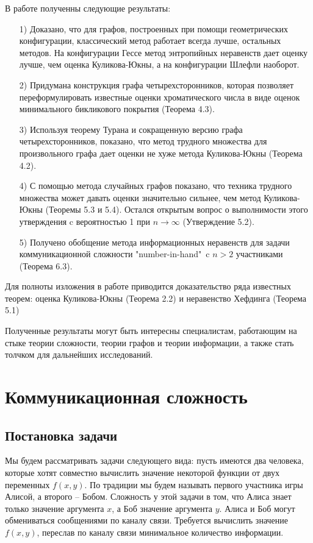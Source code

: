 \documentclass[a4paper]{article}
\begin{document}
В работе полученны следующие результаты:
\begin{itemize}[noitemsep]
    \item[1)] Доказано, что для графов, построенных при помощи геометрических конфигурации, классический метод 
    работает всегда лучше, остальных методов. На конфигурации Гессе метод энтропийных неравенств дает оценку лучше, 
    чем оценка Куликова-Юкны, а на конфигурации Шлефли наоборот. 
    \item[2)] Придумана конструкция графа четырехсторонников, которая позволяет переформулировать известные 
    оценки хроматического числа в виде оценок минимального бикликового покрытия (Теорема 4.3).
    \item[3)] Используя теорему Турана и сокращенную версию графа четырехсторонников, показано, что 
    метод трудного множества для произвольного графа дает оценки не хуже метода Куликова-Юкны (Теорема 4.2).
    \item[4)] С помощью метода случайных графов показано, что техника трудного множества может давать 
    оценки значительно сильнее, чем метод Куликова-Юкны (Теоремы 5.3 и 5.4). Остался открытым вопрос 
    о выполнимости этого утверждения c вероятностью 1 при $n \longrightarrow \infty$ (Утверждение 5.2).
    \item[5)] Получено обобщение метода информационных неравенств для задачи коммуникационной сложности 
    "number-in-hand"\ c $n>2$ участниками (Теорема 6.3).
\end{itemize}

Для полноты изложения в работе приводится доказательство ряда известных теорем: оценка Куликова-Юкны (Теорема 2.2) и 
неравенство Хефдинга (Теорема 5.1)

Полученные результаты могут быть интересны специалистам, работающим на стыке теории сложности, 
теории графов и теории информации, а также стать толчком для дальнейших исследований.
\newpage


\addtocounter{section}{1}
\section*{Коммуникационная сложность}
\setcounter{subsection}{0}

\subsection{Постановка задачи}
Мы будем рассматривать задачи следующего вида: пусть имеются два человека, которые хотят совместно
вычислить значение некоторой функции от двух переменных $f(x, y)$. По традиции мы будем называть
первого участника игры Алисой, а второго -- Бобом. Сложность у этой задачи в том, что Алиса знает только
значение аргумента $x$, а Боб значение аргумента $y$. Алиса и Боб могут обмениваться сообщениями 
по каналу связи. Требуется вычислить значение $f(x, y)$, переслав по каналу связи минимальное
количество информации.
\end{document}
